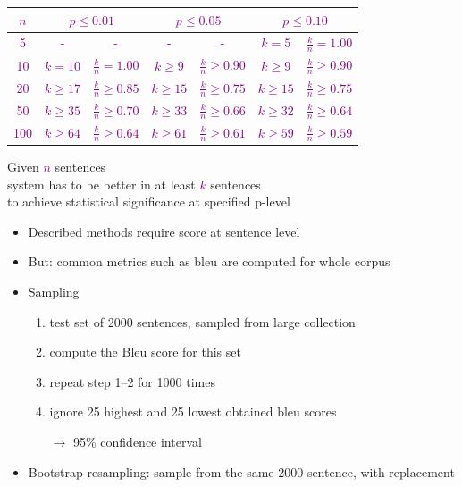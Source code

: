 \documentclass[landscape]{slides}
\newcommand{\maths}[1]{\textcolor{purple}{#1}}
\begin{document}

\vspace{20mm}
\begin{center}
\maths{\begin{tabular}{c||cc|cc|cc}
$n$ & \multicolumn{2}{c}{$p \le 0.01$} & \multicolumn{2}{|c}{$p \le 0.05$} & \multicolumn{2}{|c}{$p \le 0.10$} \\[0.5mm] \hline \hline
5 & - & - & - & - & $k = 5$ & $\frac{k}{n} = 1.00$ \\[0.5mm] \hline
10 & $k = 10$ & $\frac{k}{n} = 1.00$ & $k \ge 9$ & $\frac{k}{n} \ge 0.90$ & $k \ge 9$ & $\frac{k}{n} \ge 0.90$ \\[0.5mm] \hline
20 & $k \ge 17$ & $\frac{k}{n} \ge 0.85$ & $k \ge 15$ & $\frac{k}{n} \ge 0.75$ & $k \ge 15$ & $\frac{k}{n} \ge 0.75$ \\[0.5mm] \hline
50 & $k \ge 35$ & $\frac{k}{n} \ge 0.70$ & $k \ge 33$ & $\frac{k}{n} \ge 0.66$ & $k \ge 32$ & $\frac{k}{n} \ge 0.64$ \\[0.5mm] \hline
100 & $k \ge 64$ & $\frac{k}{n} \ge 0.64$ & $k \ge 61$ & $\frac{k}{n} \ge 0.61$ & $k \ge 59$ & $\frac{k}{n} \ge 0.59$ \\[0.5mm] \hline
\end{tabular}}

\vspace{10mm}
Given \maths{$n$} sentences\\
system has to be better in at least \maths{$k$} sentences\\
to achieve statistical significance at specified p-level
\end{center}


\vspace{10mm}
\begin{itemize}
\item Described methods require score at sentence level
\item But: common metrics such as {\sc bleu} are computed for whole corpus
\item Sampling
\begin{enumerate}
\item test set of 2000 sentences, sampled from large collection
\item compute the {\sc Bleu} score for this set
\item repeat step 1--2 for 1000 times
\item ignore 25 highest and 25 lowest obtained {\sc bleu} scores
\item[$\rightarrow$] 95\% confidence interval
\end{enumerate}
\item Bootstrap resampling: sample from the same 2000 sentence, with replacement
\end{itemize}
\end{document}
